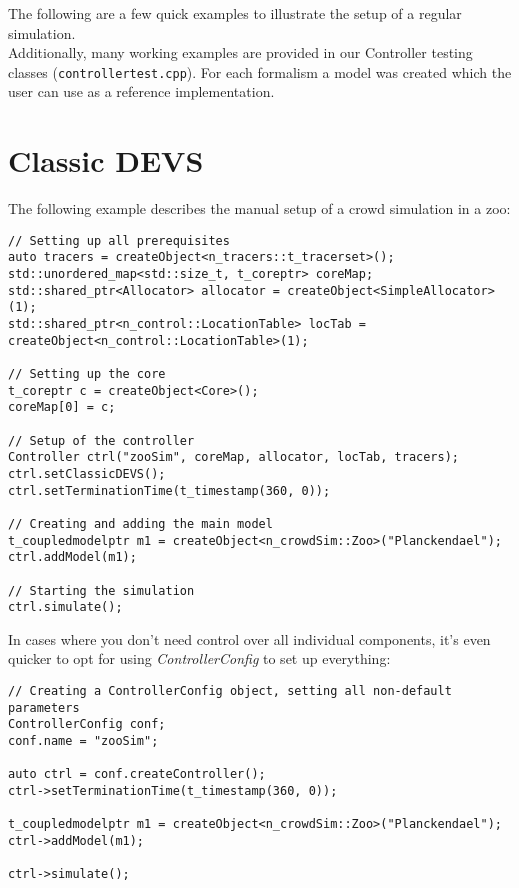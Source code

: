 The following are a few quick examples to illustrate the setup of a regular simulation.\\
Additionally, many working examples are provided in our Controller testing classes (\texttt{controllertest.cpp}). For each formalism a model was created which the user can use as a reference implementation.\\

\section{Classic DEVS}
The following example describes the manual setup of a crowd simulation in a zoo:
\begin{Verbatim}[fontsize=\small]
// Setting up all prerequisites
auto tracers = createObject<n_tracers::t_tracerset>();
std::unordered_map<std::size_t, t_coreptr> coreMap;
std::shared_ptr<Allocator> allocator = createObject<SimpleAllocator>(1);
std::shared_ptr<n_control::LocationTable> locTab = createObject<n_control::LocationTable>(1);

// Setting up the core
t_coreptr c = createObject<Core>();
coreMap[0] = c;

// Setup of the controller
Controller ctrl("zooSim", coreMap, allocator, locTab, tracers);
ctrl.setClassicDEVS();
ctrl.setTerminationTime(t_timestamp(360, 0));

// Creating and adding the main model
t_coupledmodelptr m1 = createObject<n_crowdSim::Zoo>("Planckendael");
ctrl.addModel(m1);

// Starting the simulation
ctrl.simulate();
\end{Verbatim}

In cases where you don't need control over all individual components, it's even quicker to opt for using \textsl{ControllerConfig} to set up everything:

\begin{Verbatim}[fontsize=\small]
// Creating a ControllerConfig object, setting all non-default parameters
ControllerConfig conf;
conf.name = "zooSim";

auto ctrl = conf.createController();
ctrl->setTerminationTime(t_timestamp(360, 0));

t_coupledmodelptr m1 = createObject<n_crowdSim::Zoo>("Planckendael");
ctrl->addModel(m1);

ctrl->simulate();
\end{Verbatim}


